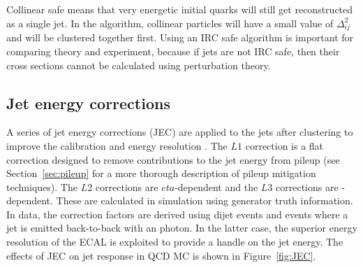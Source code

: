 Collinear safe means that very energetic initial quarks will still get reconstructed as a single jet. In the \antikt algorithm, collinear particles will have a small value of $\Delta^2_{ij}$ and will be clustered together first. Using an IRC safe algorithm is important for comparing theory and experiment, because if jets are not IRC safe, then their cross sections cannot be calculated using perturbation theory.

\subsection{Jet energy corrections}
\label{sec:JEC}

A series of jet energy corrections (JEC) are applied to the jets after clustering to improve the calibration and energy resolution \cite{JEC}. The $L1$ correction is a flat correction designed to remove contributions to the jet energy from pileup (see Section~\ref{sec:pileup} for a more thorough description of pileup mitigation techniques). The $L2$ corrections are $eta$-dependent and the $L3$ corrections are \pt-dependent. These are calculated in simulation using generator truth information. In data, the correction factors are derived using dijet events and events where a jet is emitted back-to-back with an photon. In the latter case, the superior energy resolution of the ECAL is exploited to provide a handle on the jet energy. The effects of JEC on jet response in QCD MC is shown in Figure~\ref{fig:JEC}.

